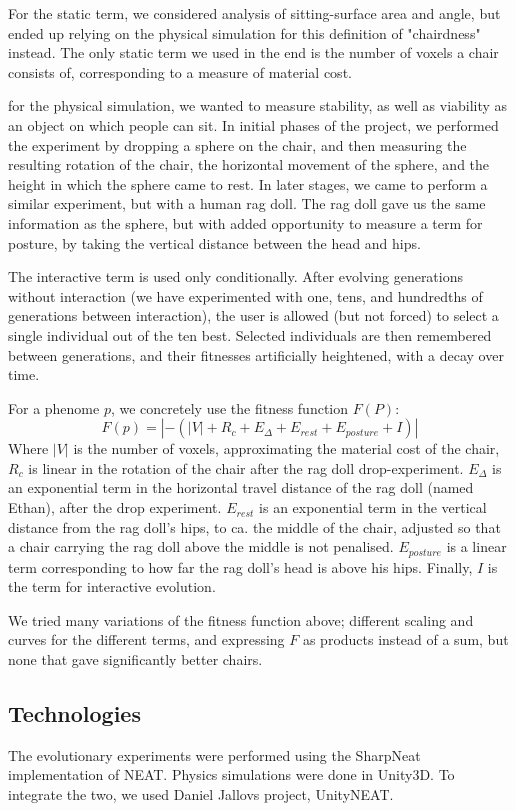 For the static term, we considered analysis of sitting-surface area and angle,
but ended up relying on the physical simulation for this definition of
"chairdness" instead. The only static term we used in the end is the number of
voxels a chair consists of, corresponding to a measure of material cost.

for the physical simulation, we wanted to measure stability, as well as
viability as an object on which people can sit. In initial phases of the
project, we performed the experiment by dropping a sphere on the chair, and then
measuring the resulting rotation of the chair, the horizontal movement of the
sphere, and the height in which the sphere came to rest. In later stages, we
came to perform a similar experiment, but with a human rag doll. The rag doll
gave us the same information as the sphere, but with added opportunity to
measure a term for posture, by taking the vertical distance between the head and
hips.

The interactive term is used only conditionally. After evolving generations
without interaction (we have experimented with one, tens, and hundredths of
generations between interaction), the user is allowed (but not forced) to select
a single individual out of the ten best. Selected individuals are then
remembered between generations, and their fitnesses artificially heightened,
with a decay over time.

For a phenome $p$, we concretely use the fitness function $F(P)$:
$$F(p) = \left|-(\left|V\right| + R_c + E_{\Delta} + E_{rest} + E_{posture} +
I)\right|$$
Where $|V|$ is the number of voxels, approximating the material cost of the
chair, $R_c$ is linear in the rotation of the chair after the rag doll
drop-experiment. $E_{\Delta}$ is an exponential term in the horizontal travel
distance of the rag doll (named Ethan), after the drop experiment. $E_{rest}$ is
an exponential term in the vertical distance from the rag doll's hips, to ca.
the middle of the chair, adjusted so that a chair carrying the rag doll above
the middle is not penalised. $E_{posture}$ is a linear term corresponding to how
far the rag doll's head is above his hips. Finally, $I$ is the term for
interactive evolution.

We tried many variations of the fitness function above; different scaling and
curves for the different terms, and expressing $F$ as products instead of a
sum, but none that gave significantly better chairs.

\subsection{Technologies}
The evolutionary experiments were performed using the
SharpNeat\cite{web:sharpneat} implementation of NEAT. Physics simulations were
done in Unity3D\cite{web:unity}. To integrate the two, we used Daniel Jallovs project, UnityNEAT\cite{web:unityneat}.

